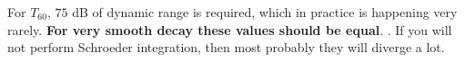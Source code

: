 For $T_{60}$, $75$ dB of dynamic range is required, which in practice is happening very rarely.
\textbf{For very smooth decay these values should be equal}.
.
If you will not perform Schroeder integration, then most probably they will diverge a lot.